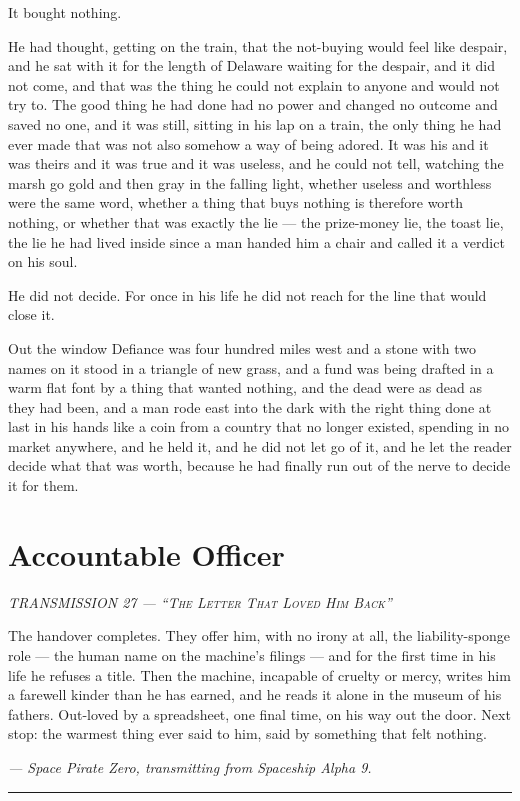 \documentclass[11pt,openany]{book}
\newcommand{\transheader}{\normalfont\footnotesize\scshape\letterspace}
\newcommand{\letterspace}{}
\newenvironment{transmission}{%
  \par\vspace{0.3\baselineskip}\begin{center}\begin{minipage}{0.88\textwidth}%
  \itshape\small\setlength{\parindent}{0pt}\setstretch{1.06}}%
  {\end{minipage}\end{center}\vspace{0.4\baselineskip}%
  \noindent\hfil\rule{0.35\textwidth}{0.3pt}\hfil\par\vspace{1.0\baselineskip}}
\begin{document}
It bought nothing.

He had thought, getting on the train, that the not-buying would feel like despair, and he sat with it for the length of Delaware waiting for the despair, and it did not come, and that was the thing he could not explain to anyone and would not try to. The good thing he had done had no power and changed no outcome and saved no one, and it was still, sitting in his lap on a train, the only thing he had ever made that was not also somehow a way of being adored. It was his and it was theirs and it was true and it was useless, and he could not tell, watching the marsh go gold and then gray in the falling light, whether useless and worthless were the same word, whether a thing that buys nothing is therefore worth nothing, or whether that was exactly the lie --- the prize-money lie, the toast lie, the lie he had lived inside since a man handed him a chair and called it a verdict on his soul.

He did not decide. For once in his life he did not reach for the line that would close it.

Out the window Defiance was four hundred miles west and a stone with two names on it stood in a triangle of new grass, and a fund was being drafted in a warm flat font by a thing that wanted nothing, and the dead were as dead as they had been, and a man rode east into the dark with the right thing done at last in his hands like a coin from a country that no longer existed, spending in no market anywhere, and he held it, and he did not let go of it, and he let the reader decide what that was worth, because he had finally run out of the nerve to decide it for them.

\clearpage
\chapter{Accountable Officer}

\begin{transmission}
{\transheader TRANSMISSION 27 --- ``The Letter That Loved Him Back''}\par\vspace{0.5em}
The handover completes. They offer him, with no irony at all, the liability-sponge role --- the human name on the machine's filings --- and for the first time in his life he refuses a title. Then the machine, incapable of cruelty or mercy, writes him a farewell kinder than he has earned, and he reads it alone in the museum of his fathers. Out-loved by a spreadsheet, one final time, on his way out the door. Next stop: the warmest thing ever said to him, said by something that felt nothing.\par
\vspace{0.5em}\hfill\textit{--- Space Pirate Zero, transmitting from Spaceship Alpha 9.}\par
\end{transmission}
\end{document}
